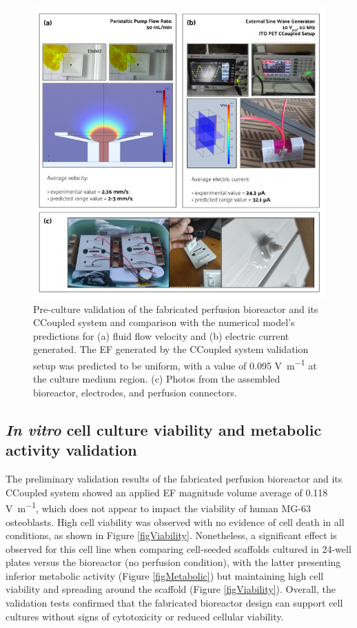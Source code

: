 \begin{figure}
\centering
\includegraphics[width=\textwidth]{./figures/Figure_6d9.png}
\caption{Pre-culture validation of the fabricated perfusion bioreactor and its \acs{CCoupled} system and comparison with the numerical model's predictions for (a) fluid flow velocity and (b) electric current generated. The \acs{EF} generated by the \acs{CCoupled} system validation setup was predicted to be uniform, with a value of 0.095 \unit{\volt\per\meter} at the culture medium region. (c) Photos from the assembled bioreactor, electrodes, and perfusion connectors.}
\label{figValidation}
\end{figure}


\subsection{\textit{In vitro} cell culture viability and metabolic activity validation}
The preliminary validation results of the fabricated perfusion bioreactor and its \acs{CCoupled} system showed an applied \acs{EF} magnitude volume average of 0.118 \unit{\volt\per\meter}, which does not appear to impact the viability of human MG-63 osteoblasts. High cell viability was observed with no evidence of cell death in all conditions, as shown in Figure \ref{figViability}. Nonetheless, a significant effect is observed for this cell line when comparing cell-seeded scaffolds cultured in 24-well plates versus the bioreactor (no perfusion condition), with the latter presenting inferior metabolic activity (Figure \ref{figMetabolic}) but maintaining high cell viability and spreading around the scaffold (Figure \ref{figViability}). Overall, the validation tests confirmed that the fabricated bioreactor design can support cell cultures without signs of cytotoxicity or reduced cellular viability.


